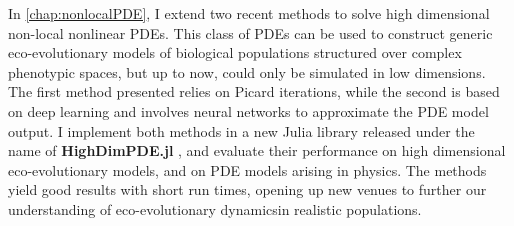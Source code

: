 In \cref{chap:nonlocalPDE}, I extend two recent methods to solve high dimensional non-local nonlinear PDEs. This class of PDEs can be used to construct generic eco-evolutionary models of biological populations structured over complex phenotypic spaces, but up to now, could only be simulated in low dimensions. The first method presented relies on Picard iterations, while the second is based on deep learning and involves neural networks to approximate the PDE model output. I implement both methods in a new Julia library released under the name of \textbf{HighDimPDE.jl} \citep{HighDimPDE}, and evaluate their performance on high dimensional eco-evolutionary models, and on PDE models arising in physics. The methods yield good results with short run times, opening up new venues to further our understanding of eco-evolutionary dynamicsin realistic populations.

\newpage


